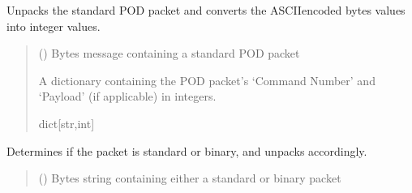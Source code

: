 \documentclass[letterpaper,10pt,english]{sphinxmanual}
\begin{document}
\begin{fulllineitems}
\begin{fulllineitems}
\label{\detokenize{BasicPodProtocol:BasicPodProtocol.POD_Basics.TranslatePODpacket_Standard}}
\pysigstartsignatures
{}
\pysigstopsignatures
\sphinxAtStartPar
Unpacks the standard POD packet and converts the ASCII\sphinxhyphen{}encoded bytes values into integer values.
\begin{quote}\begin{description}
\sphinxAtStartPar
{} () \textendash{} Bytes message containing a standard POD packet

\sphinxAtStartPar
A dictionary containing the POD packet’s ‘Command Number’ and ‘Payload’                 (if applicable) in integers.

\sphinxAtStartPar
dict{[}str,int{]}

\end{description}\end{quote}

\end{fulllineitems}


\begin{fulllineitems}
\label{\detokenize{BasicPodProtocol:BasicPodProtocol.POD_Basics.UnpackPODpacket}}
\pysigstartsignatures
{}
\pysigstopsignatures
\sphinxAtStartPar
Determines if the packet is standard or binary, and unpacks accordingly.
\begin{quote}\begin{description}
\sphinxAtStartPar
{} () \textendash{} Bytes string containing either a standard or binary packet


\end{description}
\end{quote}
\end{fulllineitems}
\end{fulllineitems}
\end{document}
